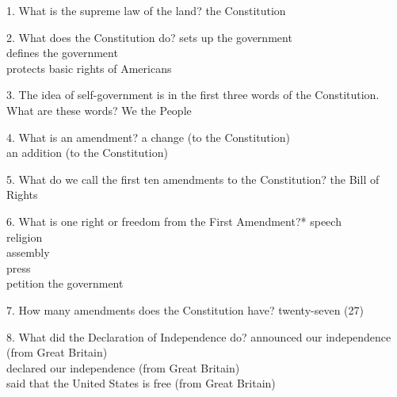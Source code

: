 \documentclass[avery5371,frame]{flashcards}
\begin{document}
        \begin{flashcard}{1. What is the supreme law of the land?}
        {the Constitution}
        \end{flashcard}
        \begin{flashcard}{2. What does the Constitution do?}
        {sets up the government\\defines the government\\protects basic rights of Americans}
        \end{flashcard}
        \begin{flashcard}{3. The idea of self-government is in the first three words of the Constitution. What are these words?}
        {We the People}
        \end{flashcard}
        \begin{flashcard}{4. What is an amendment?}
        {a change (to the Constitution)\\an addition (to the Constitution)}
        \end{flashcard}
        \begin{flashcard}{5. What do we call the first ten amendments to the Constitution?}
        {the Bill of Rights}
        \end{flashcard}
        \begin{flashcard}{6. What is one right or freedom from the First Amendment?*}
        {speech\\religion\\assembly\\press\\petition the government}
        \end{flashcard}
        \begin{flashcard}{7. How many amendments does the Constitution have?}
        {twenty-seven (27)}
        \end{flashcard}
        \begin{flashcard}{8. What did the Declaration of Independence do?}
        {announced our independence (from Great Britain)\\declared our independence (from Great Britain)\\said that the United States is free (from Great Britain)}
        \end{flashcard}
\end{document}
